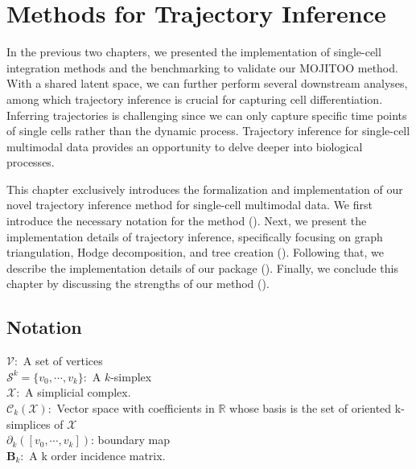 %
\chapter{Methods for Trajectory Inference}
\label{chapter:methods_TI}
\graphicspath{{chapter5/figs}}

In the previous two chapters, we presented the implementation of single-cell integration methods and the benchmarking to validate our MOJITOO method. With a shared latent space, we can further perform several downstream analyses, among which trajectory inference is crucial for capturing cell differentiation. Inferring trajectories is challenging since we can only capture specific time points of single cells rather than the dynamic process. Trajectory inference for single-cell multimodal data provides an opportunity to delve deeper into biological processes.

This chapter exclusively introduces the formalization and implementation of our novel trajectory inference method for single-cell multimodal data. We first introduce the necessary notation for the method (). Next, we present the implementation details of trajectory inference, specifically focusing on graph triangulation, Hodge decomposition, and tree creation (). Following that, we describe the implementation details of our package (). Finally, we conclude this chapter by discussing the strengths of our method ().


\section{Notation}
\label{TI_methods:notation}
$\mathcal{V}: $ A set of vertices\\
$\mathcal{S}^k = \{{v}_0,\cdots,{v}_k \}: $ A $k$-simplex\\
$\mathcal{X}: $ A simplicial complex.\\
$\mathcal{C}_k(\mathcal{X}): $ Vector space with coefficients in $\mathbb{R}$ whose basis is the set of oriented k-simplices of $\mathcal{X}$\\
$\partial_k ([v_0,\cdots, v_k])$: boundary map\\
$\mathbf{B}_k: $ A k order incidence matrix.\\

